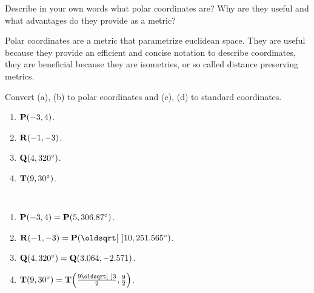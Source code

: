 \documentclass[12pt]{article} %
\begin{document}
  \begin{qstn}
    Describe in your own words what polar coordinates are? Why are they useful and what advantages do they provide
    as a metric?
  \end{qstn}
  \begin{solution}
    Polar coordinates are a metric that parametrize euclidean space. They are useful because they provide an
    efficient and concise notation to describe coordinates, they are beneficial because they are isometries,
    or so called distance preserving metrics.
  \end{solution}

    \newpage

  \begin{qstn}
    Convert (a), (b) to polar coordinates and (c), (d) to standard coordinates.
    \begin{multicols}{4}
      \begin{enumerate}[label=(\alph*)]
        \item $\vb P(-3,4)$.
          \columnbreak
        \item $\vb R(-1,-3)$.
          \columnbreak
        \item $\vb Q(4,320 ^{\circ})$.
          \columnbreak
        \item $\vb T(9,30^{\circ})$.
      \end{enumerate}
      
    \end{multicols}


  \begin{solution} \texttt{  }
    \begin{enumerate}[label=(\alph*)]
      \item $\vb P(-3,4) = \vb P(5, 306.87^{\circ})$.
      \item $\vb R(-1,-3) = \vb P\left( \sqrt{10}, 251.565^{\circ}\right)$.
      \item $\vb Q(4,320^{\circ}) = \vb Q(3.064, -2.571)$.
      \item $\vb T(9,30^{\circ}) = \vb T\left( \frac{9\sqrt{3}}{2}, \frac{9}{2}\right)$.
    \end{enumerate}
  \end{solution}

  \end{qstn}
\end{document}

